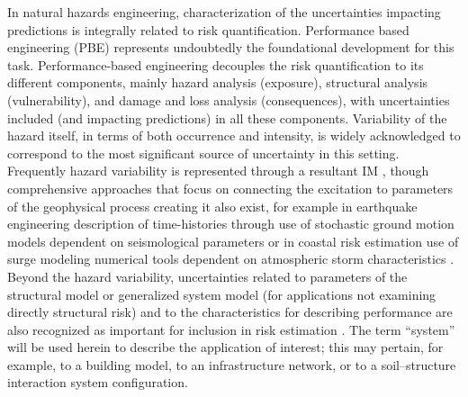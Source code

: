 In natural hazards engineering, characterization of the uncertainties impacting predictions is integrally related to risk quantification. Performance based engineering (PBE) \citep{whittaker2003performancebased, goulet2007evaluation, riggs2008experimental, ciampoli2011performancebased, barbato2013performancebased, fischer2019performancebased} represents undoubtedly the foundational development for this task. Performance-based engineering decouples the risk quantification to its different components, mainly hazard analysis (exposure), structural analysis (vulnerability), and damage and loss analysis (consequences), with uncertainties included (and impacting predictions) in all these components. Variability of the hazard itself, in terms of both occurrence and intensity, is widely acknowledged to correspond to the most significant source of uncertainty in this setting. Frequently hazard variability is represented through a resultant IM \citep{baker2005vectorvalued,kohrangi2016implications}, though comprehensive approaches that focus on connecting the excitation to parameters of the geophysical process creating it also exist, for example in earthquake engineering description of time-histories through use of stochastic ground motion models dependent on seismological parameters \citep{bijelic2018validation, vlachos2018predictive} or in coastal risk estimation use of surge modeling numerical tools dependent on atmospheric storm characteristics \citep{resio2007white}. Beyond the hazard variability, uncertainties related to parameters of the structural model or generalized system model (for applications not examining directly structural risk) and to the characteristics for describing performance are also recognized as important for inclusion in risk estimation \citep{porter2002sensitivity}. The term “system” will be used herein to describe the application of interest; this may pertain, for example, to a building model, to an infrastructure network, or to a soil–structure interaction system configuration. 

